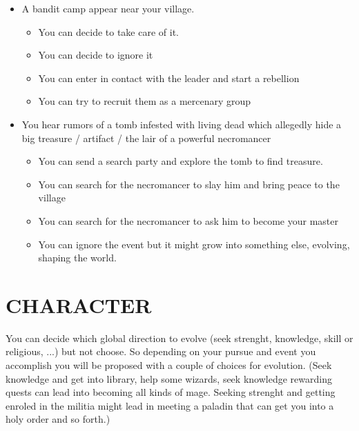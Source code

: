\documentclass{report}
\begin{document}
	\begin{itemize}
	  \item A bandit camp appear near your village. 
		\begin{itemize}
		  \item You can decide to take care of it.
		  \item You can decide to ignore it
		  \item You can enter in contact with the leader and start a rebellion
		  \item You can try to recruit them as a mercenary group
		\end{itemize}
	  \item You hear rumors of a tomb infested with living dead which allegedly hide a big treasure / artifact / the lair of a powerful necromancer
	  	\begin{itemize}
		  \item You can send a search party and explore the tomb to find treasure.
		  \item You can search for the necromancer to slay him and bring peace to the village
		  \item You can search for the necromancer to ask him to become your master
		  \item You can ignore the event but it might grow into something else, evolving, shaping the world.
		\end{itemize}
	\end{itemize}

\chapter{CHARACTER}
	\begin{comment}
	Who does the player control? What is his/her/its story? What can they do that is unique/special to this game? Can the player do several types of activities? (Driving, shooting, and so on.) Does the player ever change characters? What is the difference in play?
	Show control mapping highlighting some of the special/unique moves to this product. Include image of SKU’s controller for reference.
	\end{comment}		

	You can decide which global direction to evolve (seek strenght, knowledge, skill or religious, ...) but not choose. So depending on your pursue and event you accomplish you will be proposed with a couple of choices for evolution. (Seek knowledge and get into library, help some wizards, seek knowledge rewarding quests can lead into becoming all kinds of mage. Seeking strenght and getting enroled in the militia might lead in meeting a paladin that can get you into a holy order and so forth.)
\end{document}
